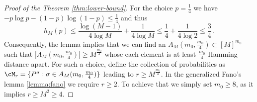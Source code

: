 \begin{proof}[Proof of the Theorem \ref{thm:lower-bound}]
For the choice $p = \frac14$ we have $- p\log p - (1 - p)\log(1 - p) \le \frac{1}{4}$ and thus 
\[
\textstyle h_{M}(p) \le \frac{\log(M-1)}{4\log M} + \frac{1}{4\log M} \le \frac14 + \frac{1}{4\log 2} \le \frac{3}{4}\,.
\]
Consequently, the lemma implies that we can find an  $A_M(m_0, \frac{m_0}{4}) \subset [M]^{m_0}$ such that $|A_M(m_0, \frac{m_0}{4})| \ge M^{\frac{m_0} 4}$ whose each element is at least $\frac{m_0}{4}$ Hamming distance apart. For such a choice, define the collection of probabilities as  $\cM_r = \{P^\sigma: \sigma \in A_M(m_0, \frac{m_0}{4})\}$ leading to $r \ge M^{\frac{m_0}{4}}$. In the generalized Fano's lemma \ref{lemma:fano} we require $r\ge 2$. To achieve that we simply set $m_0 \ge 8$, as it implies $r \ge M^2 \ge 4$.  




 
 

\end{proof}
